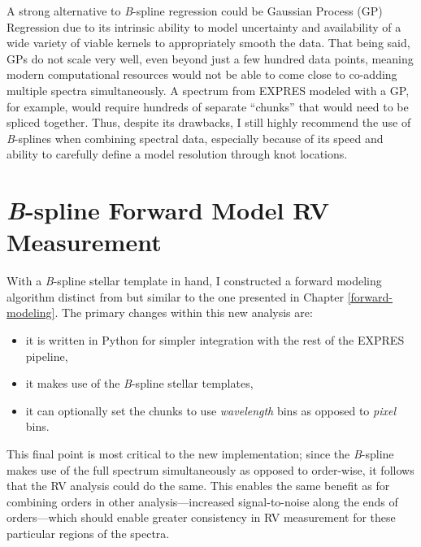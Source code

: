 A strong alternative to \textit{B}-spline regression could be Gaussian Process (GP) Regression \citep{rajpaul_robust_2020} due to its intrinsic ability to model uncertainty and availability of a wide variety of viable kernels to appropriately smooth the data. That being said, GPs do not scale very well, even beyond just a few hundred data points, meaning modern computational resources would not be able to come close to co-adding multiple spectra simultaneously. A spectrum from EXPRES modeled with a GP, for example, would require hundreds of separate ``chunks'' that would need to be spliced together. Thus, despite its drawbacks, I still highly recommend the use of \textit{B}-splines when combining spectral data, especially because of its speed and ability to carefully define a model resolution through knot locations.

\section{\textit{B}-spline Forward Model RV Measurement} \label{pipeline2:forward-model}

With a \textit{B}-spline stellar template in hand, I constructed a forward modeling algorithm distinct from but similar to the one presented in Chapter \ref{forward-modeling}. The primary changes within this new analysis are:
\begin{itemize}
    \item it is written in Python for simpler integration with the rest of the EXPRES pipeline,
    \item it makes use of the \textit{B}-spline stellar templates,
    \item it can optionally set the chunks to use \textit{wavelength} bins as opposed to \textit{pixel} bins.
\end{itemize}
This final point is most critical to the new implementation; since the \textit{B}-spline makes use of the full spectrum simultaneously as opposed to order-wise, it follows that the RV analysis could do the same. This enables the same benefit as for combining orders in other analysis---increased signal-to-noise along the ends of orders---which should enable greater consistency in RV measurement for these particular regions of the spectra.

